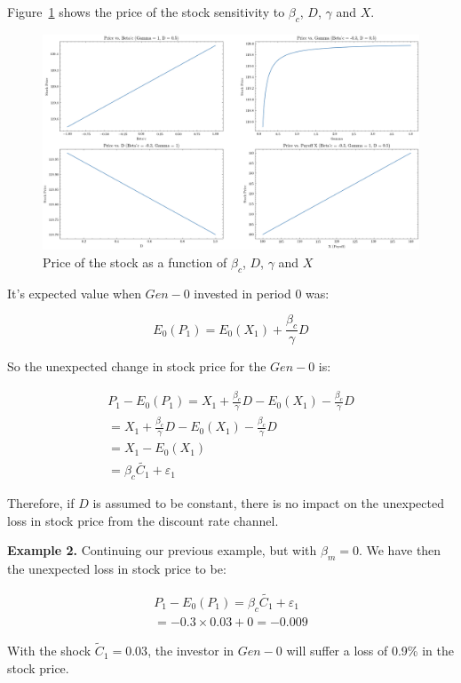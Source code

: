Figure~\ref{fig:price} shows the price of the stock 
sensitivity to $\beta_{c}$, $D$, $\gamma$ and $X$.

\begin{figure}
    \includegraphics[width=\textwidth]{../images/chapter02/price_vs_parameters.png}
    \caption{Price of the stock as a function of $\beta_{c}$, $D$, $\gamma$ and 
    $X$}
    \label{fig:price}
\end{figure}

It's expected value when $Gen-0$ invested in period 0 was:

\begin{equation}
    E_0(P_1) = E_0(X_1) + \frac{\beta_{c}}{\gamma}D
\end{equation}

So the unexpected change in stock price 
for the $Gen-0$ is:

\begin{equation}
    \begin{aligned}
    P_1 - E_0(P_1) = X_1 + \frac{\beta_{c}}{\gamma}D - E_0(X_1) - \frac{\beta_{c}}{\gamma}D \\
    = X_1 + \frac{\beta_{c}}{\gamma}D - E_0(X_1) - \frac{\beta_{c}}{\gamma}D \\
    = X_1 - E_0(X_1) \\
    = \beta_{c} \tilde{C_1} + \varepsilon_1
    \end{aligned}
\end{equation}

Therefore, if $D$ is assumed to be constant,
there is no impact on the unexpected loss 
in stock price from the discount rate channel.

\begin{example}[]
    \textbf{Example 2.} 
    Continuing our previous example, but with 
    $\beta_m = 0$. We have then 
    the unexpected loss in stock price to be: 

    \begin{equation}
        \begin{aligned}
        P_1 - E_0(P_1) = \beta_{c} \tilde{C_1} + \varepsilon_1 \\
        = -0.3 \times 0.03 + 0 = -0.009
        \end{aligned}
    \end{equation}

    With the shock $\tilde{C}_1 = 0.03$, the
    investor in $Gen-0$ will 
    suffer a loss of 0.9\% in the stock price.
    
\end{example}

